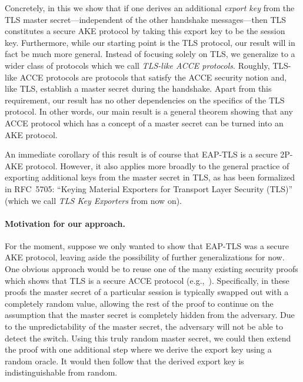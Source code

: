 Concretely,
in this  we show that if one derives an additional \emph{export key} from the TLS master secret---independent 
of the other handshake messages---then TLS constitutes a secure AKE protocol by taking this export key to be the session key.  
Furthermore, while our starting point is the TLS protocol, 
our result will in fact be much more general.
Instead of focusing solely on TLS,
we generalize to a wider class of protocols which we call \emph{TLS-like ACCE protocols}.  
Roughly, 
TLS-like ACCE protocols are protocols that satisfy the ACCE security notion and, 
like TLS, establish a master secret during the handshake.
Apart from this requirement, our result has no other dependencies on the specifics of the TLS protocol.
In other words, our main result is a general theorem showing that any ACCE protocol which has a concept of a master secret can be turned into an AKE protocol.

An immediate corollary of this result is of course that EAP-TLS is a secure 2P-AKE protocol.
However,
it also applies more broadly to the general practice of exporting additional keys from the master secret in TLS,
as has been formalized in RFC~5705: ``Keying Material Exporters for Transport Layer Security (TLS)''~\cite{IETF:RFC5705:TLS-key-exporters}
(which we call \emph{TLS Key Exporters} from now on).




\paragraph{Motivation for our approach.}
For the moment,
suppose we only wanted to show that EAP-TLS was a secure AKE protocol,
leaving aside the possibility of further generalizations for now.
One obvious approach would be to reuse one of the many existing security proofs which shows that TLS is a secure ACCE protocol 
(e.g.,~\cite{C:JKSS12,EPRINT:KohSchSch13,PKC:LSYKS14}).
Specifically, in these proofs the master secret of a particular session is typically swapped out with a completely random value,
allowing the rest of the proof to continue on the assumption that the master secret is completely hidden from the adversary.
Due to the unpredictability of the master secret,
the adversary will not be able to detect the switch.
Using this truly random master secret,
we could then extend the proof with one additional step where we derive the export key using a random oracle.
It would then follow that the derived export key is indistinguishable from random. 

